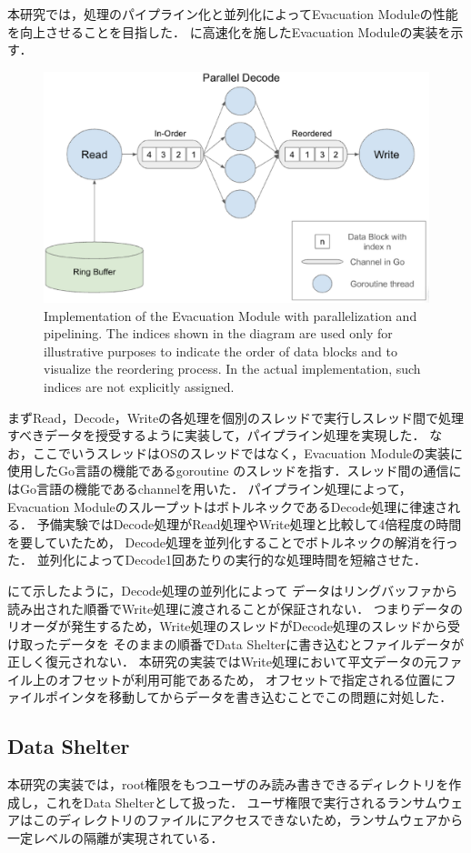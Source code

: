 本研究では，処理のパイプライン化と並列化によってEvacuation Moduleの性能を向上させることを目指した．
に高速化を施したEvacuation Moduleの実装を示す．
\begin{figure}[t]
  \begin{center}
    \includegraphics[width=\columnwidth]{doc/img/evac_mon_impl.eps}
  \end{center}
  \caption{Implementation of the Evacuation Module with parallelization and pipelining.
    The indices shown in the diagram are used only for illustrative purposes to indicate
    the order of data blocks and to visualize the reordering process. In the actual implementation,
    such indices are not explicitly assigned.
  }
  \label{fig:evac-mon-impl}
\end{figure}
まずRead，Decode，Writeの各処理を個別のスレッドで実行しスレッド間で処理すべきデータを授受するように実装して，パイプライン処理を実現した．
なお，ここでいうスレッドはOSのスレッドではなく，Evacuation Moduleの実装に使用したGo言語の機能であるgoroutine \cite{TheGoMem67:online}
のスレッドを指す．スレッド間の通信にはGo言語の機能であるchannelを用いた．
パイプライン処理によって，Evacuation ModuleのスループットはボトルネックであるDecode処理に律速される．
予備実験ではDecode処理がRead処理やWrite処理と比較して4倍程度の時間を要していたため，
Decode処理を並列化することでボトルネックの解消を行った．
並列化によってDecode1回あたりの実行的な処理時間を短縮させた．

にて示したように，Decode処理の並列化によって
データはリングバッファから読み出された順番でWrite処理に渡されることが保証されない．
つまりデータのリオーダが発生するため，Write処理のスレッドがDecode処理のスレッドから受け取ったデータを
そのままの順番でData Shelterに書き込むとファイルデータが正しく復元されない．
本研究の実装ではWrite処理において平文データの元ファイル上のオフセットが利用可能であるため，
オフセットで指定される位置にファイルポインタを移動してからデータを書き込むことでこの問題に対処した．

\subsection{Data Shelter}
本研究の実装では，root権限をもつユーザのみ読み書きできるディレクトリを作成し，これをData Shelterとして扱った．
ユーザ権限で実行されるランサムウェアはこのディレクトリのファイルにアクセスできないため，ランサムウェアから一定レベルの隔離が実現されている．

